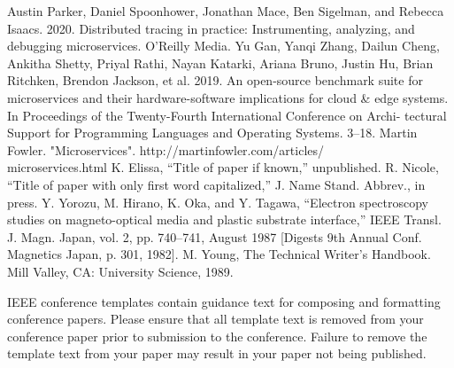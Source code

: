 \documentclass[conference]{IEEEtran}
\begin{document}
\begin{thebibliography}{00}
     Austin Parker, Daniel Spoonhower, Jonathan Mace, Ben Sigelman, and Rebecca Isaacs. 2020. Distributed tracing in practice: Instrumenting, analyzing, and debugging microservices. O’Reilly Media.
     Yu Gan, Yanqi Zhang, Dailun Cheng, Ankitha Shetty, Priyal Rathi, Nayan Katarki, Ariana Bruno, Justin Hu, Brian Ritchken, Brendon Jackson, et al. 2019. An open-source benchmark suite for microservices and their hardware-software implications for cloud \& edge systems. In Proceedings of the Twenty-Fourth International Conference on Archi- tectural Support for Programming Languages and Operating Systems. 3–18.
     \sloppy Martin Fowler. "Microservices". http://martinfowler.com/articles/\\microservices.html
     K. Elissa, ``Title of paper if known,'' unpublished.
     R. Nicole, ``Title of paper with only first word capitalized,'' J. Name Stand. Abbrev., in press.
     Y. Yorozu, M. Hirano, K. Oka, and Y. Tagawa, ``Electron spectroscopy studies on magneto-optical media and plastic substrate interface,'' IEEE Transl. J. Magn. Japan, vol. 2, pp. 740--741, August 1987 [Digests 9th Annual Conf. Magnetics Japan, p. 301, 1982].
     M. Young, The Technical Writer's Handbook. Mill Valley, CA: University Science, 1989.
\end{thebibliography}
\vspace{12pt}
\color{red}
IEEE conference templates contain guidance text for composing and formatting conference papers. Please ensure that all template text is removed from your conference paper prior to submission to the conference. Failure to remove the template text from your paper may result in your paper not being published.
\end{document}
